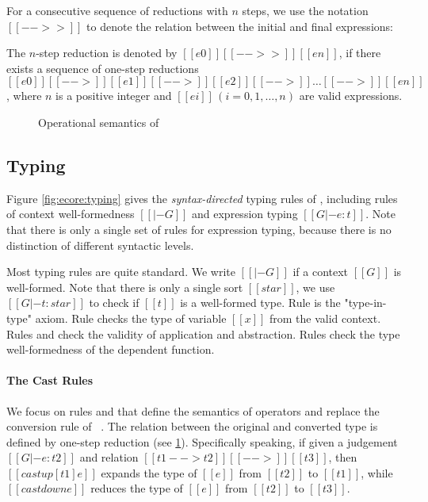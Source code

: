 For a consecutive sequence of reductions
with $n$ steps, we use the notation $[[-->>]]$ to denote the relation
between the initial and final expressions:

\begin{dfn}
    The $n$-step reduction is denoted by $[[e0]] [[-->>]] [[en]]$, if
    there exists a sequence of one-step reductions $[[e0]] [[-->]]
    [[e1]] [[-->]] [[e2]] [[-->]] \dots [[-->]] [[en]]$, where $n$ is
    a positive integer and $[[ei]]\,(i=0,1,\dots,n)$ are valid
    expressions.
\end{dfn}

\begin{figure}
    \ottdefnstep{}
    \caption{Operational semantics of \ecore}
    \label{fig:ecore:opsem}
\end{figure}

\subsection{Typing}\label{sec:ecore:type}

Figure \ref{fig:ecore:typing} gives the \emph{syntax-directed} typing
rules of \ecore, including rules of context well-formedness $[[|- G]]$
and expression typing $[[G |- e : t]]$. Note that there is only a
single set of rules for expression typing, because there is no
distinction of different syntactic levels.

Most typing rules are quite standard. We write $[[|- G]]$ if a context
$[[G]]$ is well-formed. Note that there is only a single sort
$[[star]]$, we use $[[G |- t : star]]$ to check if $[[t]]$ is a
well-formed type. Rule  is the "type-in-type"
axiom. Rule  checks the type of variable $[[x]]$ from
the valid context. Rules  and  check
the validity of application and abstraction. Rules 
check the type well-formedness of the dependent function.

\paragraph{The Cast Rules}
We focus on rules  and  that
define the semantics of \cast operators and replace the conversion
rule of \cc~. The relation between the original
and converted type is defined by one-step reduction (see
\ref{fig:ecore:opsem}). Specifically speaking, if given a judgement
$[[G |- e : t2]]$ and relation $[[t1 --> t2]] [[-->]] [[t3]]$, then
$[[castup [t1] e]]$ expands the type of $[[e]]$ from $[[t2]]$ to
$[[t1]]$, while $[[castdown e]]$ reduces the type of $[[e]]$ from
$[[t2]]$ to $[[t3]]$.

